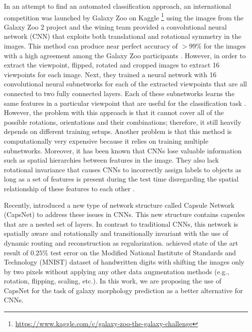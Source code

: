 \documentclass[a4paper,fleqn,usenatbib]{mnras}
\begin{document}
 In an attempt to find an automated classification approach, an international competition was launched by Galaxy Zoo on Kaggle \footnote{\url{https://www.kaggle.com/c/galaxy-zoo-the-galaxy-challenge}} using the images from the Galaxy Zoo 2 project \citep{willett2013galaxy} and the wining team provided a convolutional neural network (CNN) that exploits both translational and rotational symmetry in the images. This method can produce near perfect accuracy of $>99$\% for the images with a high agreement among the Galaxy Zoo participants \citep{dieleman2015rotation}. However, in order to extract the viewpoint, \cite{dieleman2015rotation} flipped, rotated and cropped images to extract 16 viewpoints for each image. Next, they trained a neural network with 16 convolutional neural subnetworks for each of the extracted viewpoints that are all connected to two fully connected layers. Each of these subnetworks learns the same features in a particular viewpoint that are useful for the classification task \citep{dieleman2015rotation}. However, the problem with this approach is that it cannot cover all of the possible rotations, orientations and their combinations; therefore, it still heavily depends on different training setups. Another problem is that this method is computationally very expensive because it relies on training multiple subnetworks. Moreover, it has been known that CNNs lose valuable information such as spatial hierarchies between features in the image. They also lack rotational invariance that causes CNNs to incorrectly assign labels to objects as long as a set of features is present during the test time disregarding the spatial relationship of these features to each other \citep{sabour2017dynamic}. 
 
 Recently, \cite{sabour2017dynamic} introduced a new type of network structure called Capsule Network (CapsNet) to address these issues in CNNs. This new structure contains capsules that are a nested set of layers. In contrast to traditional CNNs, this network is spatially aware and rotationally and transitionally invariant with the use of dynamic routing and reconstruction as regularization. \cite{sabour2017dynamic} achieved state of the art result of $0.25$\% test error on the Modified National Institute of Standards and Technology (MNIST) dataset of handwritten digits with shifting the images only by two pixels without applying any other data augmentation methods (e.g., rotation, flipping, scaling, etc.). In this work, we are proposing the use of CapsNet for the task of galaxy morphology prediction as a better alternative for CNNs. 
 
\end{document}
